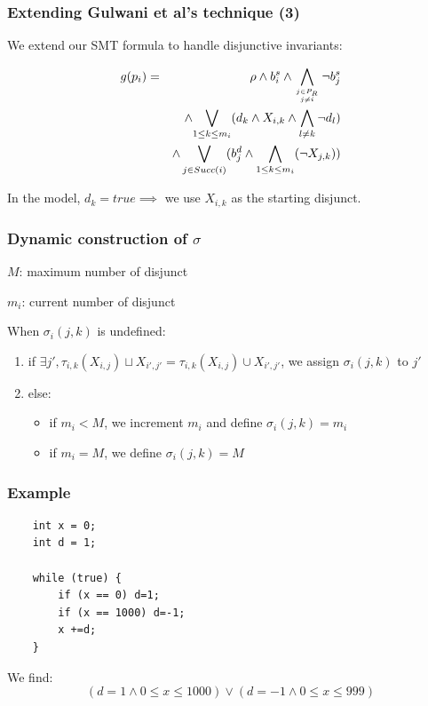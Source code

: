 \documentclass{beamer}
\newcommand{\important}[1]{\color{trefle}{#1}}
\begin{document}
\begin{frame}
	\frametitle{Extending Gulwani et al's technique (3)}

We extend our SMT formula to handle disjunctive invariants:

\begin{eqnarray*}
g(p_i) & = & \rho \wedge b_i^s \wedge 
\displaystyle\bigwedge_{j \in P_R \atop j \neq i} \neg b_j^s  \\
 & & \wedge 
\important{\displaystyle\bigvee_{1 \leq k \leq m_i} (d_k \wedge X_{i,k} \wedge \bigwedge_{l \neq k}
\neg d_l)} \\
 & & \wedge
\displaystyle\bigvee_{j \in Succ(i)} 
(b_j^d \wedge \important{\bigwedge_{1 \leq k \leq m_i} (\neg X_{j,k})})
\end{eqnarray*}

In the model, $d_k = true \implies$ we use $X_{i,k}$ as the starting disjunct.
\end{frame}

\begin{frame}
	\frametitle{Dynamic construction of $\sigma$}

	$M$: maximum number of disjunct

	$m_i$: current number of disjunct

	\vspace{1cm}
When $\sigma_i(j,k)$ is undefined:
\begin{enumerate}
	\item if $\exists j', \tau_{i,k}(X_{i,j}) \sqcup X_{i',j'} =
		\tau_{i,k}(X_{i,j}) \cup X_{i',j'}$, we assign $\sigma_i(j,k)$ to $j'$
	\item else:
	\begin{itemize}
		\item if $m_i < M$, we increment $m_i$ and define $\sigma_i(j,k) = m_i$
		\item if $m_i = M$, we define $\sigma_i(j,k) = M$ 
	\end{itemize}
\end{enumerate}
\end{frame}

\begin{frame}[containsverbatim]
	\frametitle{Example}
\begin{center}
\begin{lstlisting}
	int x = 0;
	int d = 1;
	
	while (true) {
		if (x == 0) d=1;
		if (x == 1000) d=-1;
		x +=d;
	}
\end{lstlisting}
\end{center}
We find:
$$(d = 1 \wedge 0 \leq x \leq 1000) \vee
(d = -1 \wedge 0 \leq x \leq 999)$$
\end{frame}
\end{document}
